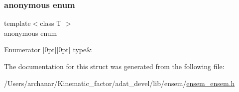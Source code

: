 \subsubsection{\texorpdfstring{anonymous enum}{anonymous enum}}
{\footnotesize\ttfamily template$<$class T $>$ \\
anonymous enum}

\begin{DoxyEnumFields}{Enumerator}
[0pt][0pt]{}\mbox{\label{structENSEM_1_1EnsbcIO_3_01Ensem_3_01T_01_4_01_4_ac4789ded6d044ac8640f0c3e7c7559bea69aac019e5c8434d1fa6bc1587dfec89}} 
type&\\
\hline

\end{DoxyEnumFields}


The documentation for this struct was generated from the following file\+:\begin{DoxyCompactItemize}
\item 
/\+Users/archanar/\+Kinematic\+\_\+factor/adat\+\_\+devel/lib/ensem/\mbox{\hyperlink{lib_2ensem_2ensem__ensem_8h}{ensem\+\_\+ensem.\+h}}\end{DoxyCompactItemize}
